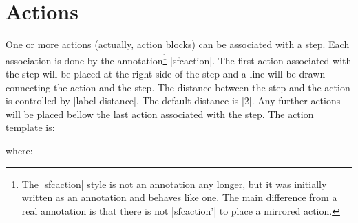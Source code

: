 \documentclass[a4paper]{ltxdoc}
\begin{document}
\section{Actions\label{sec:actions}}
One or more actions (actually, action blocks) can be associated with a step. Each association is done by the annotation\footnote{The |sfcaction| style is not an annotation any longer, but it was initially written as an annotation and behaves like one. The main difference from a real annotation is that there is not |sfcaction'| to place a mirrored action.} |sfcaction|. The first action associated with the step will be placed at the right side of the step and a line will be drawn connecting the action and the step. The distance between the step and the action is controlled by |label distance|. The default distance is |2\tikzcircuitssizeunit|. Any further actions will be placed bellow the last action associated with the step. The action template is:
\begin{center}
\end{center}
\noindent{}where:
\end{document}
